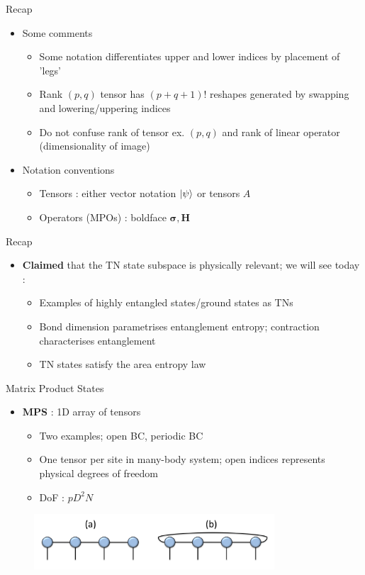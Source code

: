 \documentclass{beamer}
\begin{document}
\begin{frame}{Recap}
	\begin{itemize}
\item Some comments
	\begin{itemize}
	\item Some notation differentiates upper and lower indices by placement of 'legs'
	\item Rank ${ (p,q) }$ tensor has ${ (p+q+1)! }$ reshapes generated by swapping and lowering/uppering indices 
	\item Do not confuse rank of tensor ex. ${ (p,q) }$ and rank of linear operator (dimensionality of image)
	\end{itemize}
\item Notation conventions
	\begin{itemize}
	\item Tensors : either vector notation ${ \ket{\psi } }$ or tensors ${ A }$
	\item Operators (MPOs) : boldface ${ \boldsymbol{\sigma }, \boldsymbol{H} }$
	\end{itemize}
\end{itemize}
\end{frame}

\begin{frame}{Recap}
	\begin{itemize}
\item \textbf{Claimed} that the TN state subspace is physically relevant; we will see today :
	\begin{itemize}
		\item Examples of highly entangled states/ground states as TNs
	\item Bond dimension parametrises entanglement entropy; contraction characterises entanglement
	\item TN states satisfy the area entropy law 
	\end{itemize}
\end{itemize}
\end{frame}


\begin{frame}{Matrix Product States}
	\begin{itemize}
		\item \textbf{MPS} : 1D array of tensors
		\begin{itemize}
		\item Two examples; open BC, periodic BC
		\item One tensor per site in many-body system; open indices represents physical degrees of freedom
		\item DoF : ${ pD^2N }$
		\end{itemize}
	\end{itemize}
	\begin{figure}[h]
	\includegraphics[width=0.8\textwidth]{mps}
	\centering
	\end{figure}
	
\end{frame}
\end{document}
